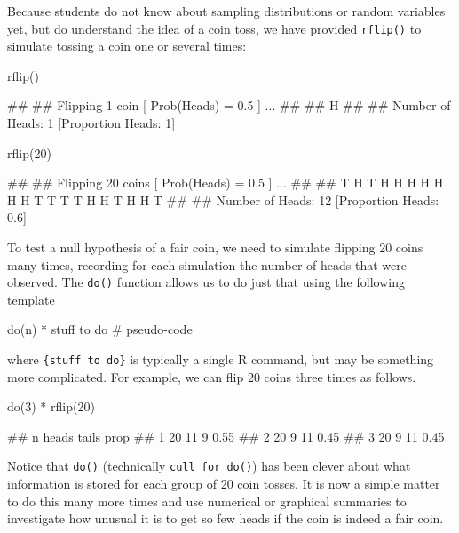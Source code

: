 Because students do not know about sampling distributions or random
variables yet, but do understand the idea of a coin toss, we have
provided \texttt{rflip()} to simulate tossing a coin one or several
times:

\begin{Schunk}
\begin{Sinput}
rflip()
\end{Sinput}
\begin{Soutput}
## 
## Flipping 1 coin [ Prob(Heads) = 0.5 ] ...
## 
## H
## 
## Number of Heads: 1 [Proportion Heads: 1]
\end{Soutput}
\begin{Sinput}
rflip(20)
\end{Sinput}
\begin{Soutput}
## 
## Flipping 20 coins [ Prob(Heads) = 0.5 ] ...
## 
## T H T H H H H H H H T T T T H H T H H T
## 
## Number of Heads: 12 [Proportion Heads: 0.6]
\end{Soutput}
\end{Schunk}

To test a null hypothesis of a fair coin, we need to simulate flipping
20 coins many times, recording for each simulation the number of heads
that were observed. The \texttt{do()} function allows us to do just that
using the following template

\begin{Schunk}
\begin{Sinput}
do(n) * {stuff to do}             # pseudo-code
\end{Sinput}
\end{Schunk}

\noindent
where \texttt{\{stuff\ to\ do\}} is typically a single R command, but
may be something more complicated. For example, we can flip 20 coins
three times as follows.

\begin{Schunk}
\begin{Sinput}
do(3) * rflip(20)
\end{Sinput}
\begin{Soutput}
##    n heads tails prop
## 1 20    11     9 0.55
## 2 20     9    11 0.45
## 3 20     9    11 0.45
\end{Soutput}
\end{Schunk}

\noindent
Notice that \texttt{do()} (technically \texttt{cull\_for\_do()}) has
been clever about what information is stored for each group of 20 coin
tosses. It is now a simple matter to do this many more times and use
numerical or graphical summaries to investigate how unusual it is to get
so few heads if the coin is indeed a fair coin.


